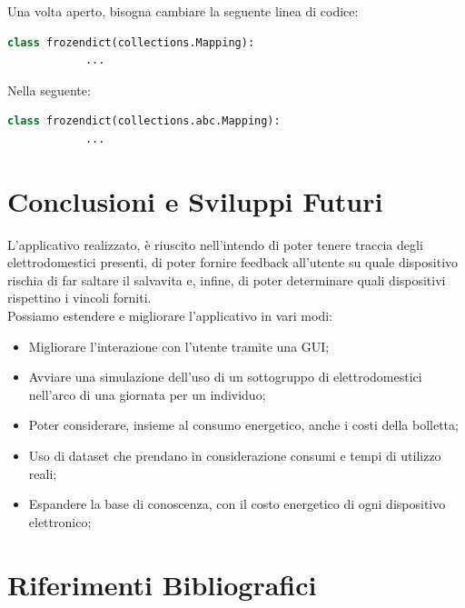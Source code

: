 \documentclass[12pt, letterpaper]{article}
\begin{document}
\noindent Una volta aperto, bisogna cambiare la seguente linea di codice: \\

\begin{lstlisting}[language=Python]
      class frozendict(collections.Mapping):
            ...
\end{lstlisting}

Nella seguente:

\begin{lstlisting}[language=Python]
      class frozendict(collections.abc.Mapping):
            ...
\end{lstlisting}

\section{Conclusioni e Sviluppi Futuri}

L'applicativo realizzato, è riuscito nell'intendo di poter tenere traccia degli elettrodomestici
presenti, di poter fornire feedback all'utente su quale dispositivo rischia di far saltare il salvavita
e, infine, di poter determinare quali dispositivi rispettino i vincoli forniti. \\

\noindent Possiamo estendere e migliorare l'applicativo in vari modi:
\begin{itemize}
      \item Migliorare l'interazione con l'utente tramite una GUI;
      \item Avviare una simulazione dell'uso di un sottogruppo di elettrodomestici
            nell'arco di una giornata per un individuo;
      \item Poter considerare, insieme al consumo energetico, anche i costi della bolletta;
      \item Uso di dataset che prendano in considerazione consumi e tempi di utilizzo reali;
      \item Espandere la base di conoscenza, con il costo energetico di ogni dispositivo elettronico;
\end{itemize}

\section{Riferimenti Bibliografici}
\end{document}
